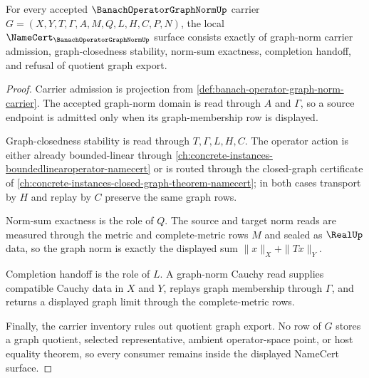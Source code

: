 \begin{theorem}
\label{thm:banach-operator-graph-norm-obligations}
For every accepted $\BanachOperatorGraphNormUp$ carrier $G=(X,Y,T,\Gamma,A,M,Q,L,H,C,P,N)$, the local $\NameCert_{\BanachOperatorGraphNormUp}$ surface consists exactly of graph-norm carrier admission, graph-closedness stability, norm-sum exactness, completion handoff, and refusal of quotient graph export.
\end{theorem}
\begin{proof}
Carrier admission is projection from \autoref{def:banach-operator-graph-norm-carrier}. The accepted graph-norm domain is read through $A$ and $\Gamma$, so a source endpoint is admitted only when its graph-membership row is displayed.

Graph-closedness stability is read through $T,\Gamma,L,H,C$. The operator action is either already bounded-linear through \autoref{ch:concrete-instances-boundedlinearoperator-namecert} or is routed through the closed-graph certificate of \autoref{ch:concrete-instances-closed-graph-theorem-namecert}; in both cases transport by $H$ and replay by $C$ preserve the same graph rows.

Norm-sum exactness is the role of $Q$. The source and target norm reads are measured through the metric and complete-metric rows $M$ and sealed as $\RealUp$ data, so the graph norm is exactly the displayed sum $\|x\|_X+\|T x\|_Y$.

Completion handoff is the role of $L$. A graph-norm Cauchy read supplies compatible Cauchy data in $X$ and $Y$, replays graph membership through $\Gamma$, and returns a displayed graph limit through the complete-metric rows.

Finally, the carrier inventory rules out quotient graph export. No row of $G$ stores a graph quotient, selected representative, ambient operator-space point, or host equality theorem, so every consumer remains inside the displayed NameCert surface.
\end{proof}

